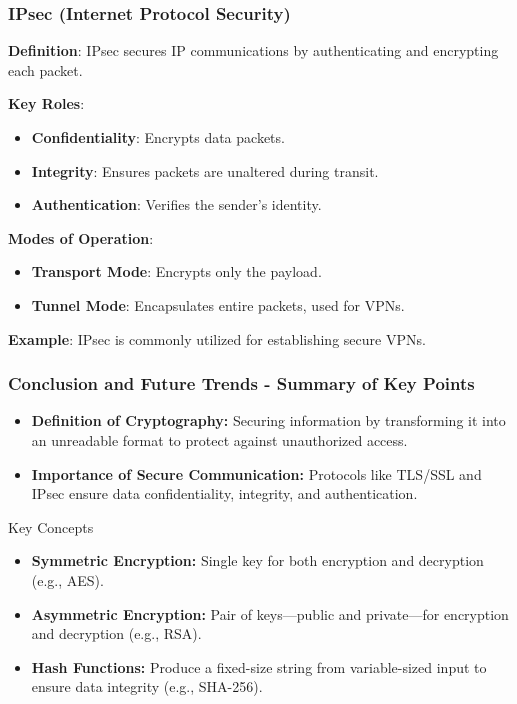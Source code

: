 \documentclass{beamer}
\begin{document}
\begin{frame}[fragile]
    \frametitle{IPsec (Internet Protocol Security)}
    \textbf{Definition}: 
    IPsec secures IP communications by authenticating and encrypting each packet.

    \textbf{Key Roles}:
    \begin{itemize}
        \item \textbf{Confidentiality}: Encrypts data packets.
        \item \textbf{Integrity}: Ensures packets are unaltered during transit.
        \item \textbf{Authentication}: Verifies the sender's identity.
    \end{itemize}

    \textbf{Modes of Operation}:
    \begin{itemize}
        \item \textbf{Transport Mode}: Encrypts only the payload.
        \item \textbf{Tunnel Mode}: Encapsulates entire packets, used for VPNs.
    \end{itemize}
    
    \textbf{Example}: 
    IPsec is commonly utilized for establishing secure VPNs.
\end{frame}

\begin{frame}[fragile]
    \frametitle{Conclusion and Future Trends - Summary of Key Points}
    \begin{itemize}
        \item \textbf{Definition of Cryptography:} Securing information by transforming it into an unreadable format to protect against unauthorized access.
        \item \textbf{Importance of Secure Communication:} Protocols like TLS/SSL and IPsec ensure data confidentiality, integrity, and authentication.
    \end{itemize}
    
    \begin{block}{Key Concepts}
        \begin{itemize}
            \item \textbf{Symmetric Encryption:} Single key for both encryption and decryption (e.g., AES).
            \item \textbf{Asymmetric Encryption:} Pair of keys—public and private—for encryption and decryption (e.g., RSA).
            \item \textbf{Hash Functions:} Produce a fixed-size string from variable-sized input to ensure data integrity (e.g., SHA-256).
        \end{itemize}
    \end{block}
\end{frame}
\end{document}
